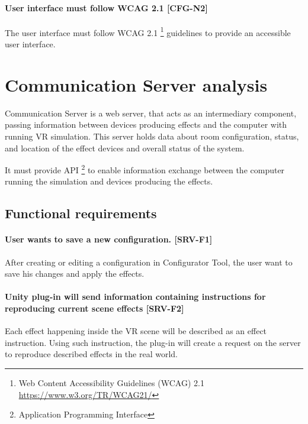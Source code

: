 \hypertarget{x-\textbf{user-interface-must-follow-wcag-2.1}-[cfg-n2]}{\paragraph*{\textbf{User interface must follow WCAG 2.1} [CFG-N2]}}
The user interface must follow WCAG 2.1
\footnote{Web Content Accessibility Guidelines (WCAG) 2.1 \href{https://www.w3.org/TR/WCAG21/}{https://www.w3.org/TR/WCAG21/}}
guidelines to provide an accessible user interface.


\hypertarget{x-communication-server-analysis}{\section{Communication Server analysis}}
Communication Server is a web server, that acts as an intermediary component,
passing information between devices producing effects and the computer with
running VR simulation. This server holds data about room configuration,
status, and location of the effect devices and overall status of the system.


It must provide API \footnote{Application Programming Interface} to enable
information exchange between the computer running the simulation and devices
producing the effects.


\hypertarget{x-functional-requirements}{\subsection{Functional requirements}}
\hypertarget{x-\textbf{user-wants-to-save-a-new-configuration.}-[srv-f1]}{\paragraph*{\textbf{User wants to save a new configuration.} [SRV-F1]}}
After creating or editing a configuration in Configurator Tool, the user
want to save his changes and apply the effects.


\hypertarget{x-\textbf{unity-plug-in-will-send-information-containing-instructions-for-reproducing-current-scene-effects}-[srv-f2]}{\paragraph*{\textbf{Unity plug-in will send information containing instructions for reproducing current scene effects} [SRV-F2]}}
Each effect happening inside the VR scene will be described as an effect
instruction. Using such instruction, the plug-in will create a request on the server to
reproduce described effects in the real world.


